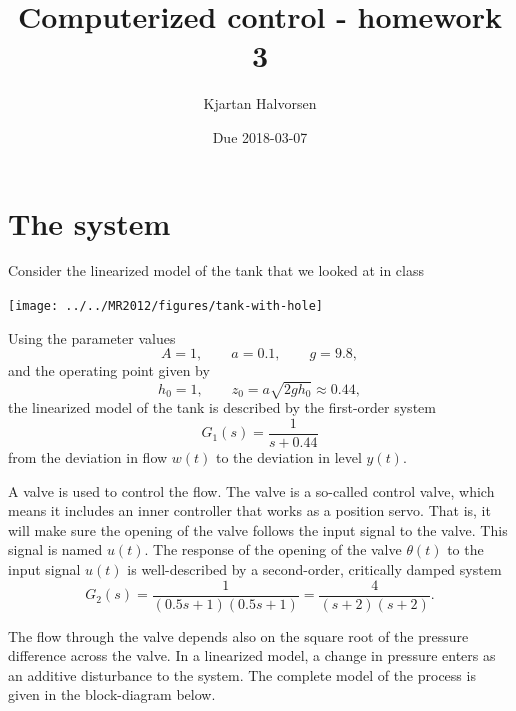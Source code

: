 \documentclass[a4paper]{scrartcl}
\author{Kjartan Halvorsen}
\date{Due 2018-03-07}
\title{Computerized control - homework 3}
\begin{document}
\maketitle

\section*{The system}
\label{sec-1}
Consider the linearized model of the tank that we looked at in class

\begin{center}
\texttt{[image: ../../MR2012/figures/tank-with-hole]}
\end{center}
Using the parameter values 
\[ A = 1, \qquad a = 0.1, \qquad g = 9.8,\]
and the operating point given by
\[ h_0 = 1, \qquad z_0 = a\sqrt{2gh_0} \approx 0.44,\]
the linearized model of the tank is described by the first-order system
\[ G_1(s) = \frac{1}{s + 0.44}\]
from the deviation in flow $w(t)$ to the deviation in level $y(t)$.

A valve is used to control the flow. The valve is a so-called control valve, which means it includes an inner controller that works as a position servo. That is, it will make sure the opening of the valve follows the input signal to the valve. This signal is named $u(t)$. The response of the opening of the valve $\theta(t)$ to the input signal $u(t)$ is well-described by a second-order, critically damped system
\[ G_2(s) = \frac{1}{(0.5s + 1)(0.5s+1)} = \frac{4}{(s+2)(s+2)}. \]

The flow through the valve depends also on the square root of the pressure difference across the valve. In a linearized model, a change in pressure enters as an additive disturbance to the system. The complete model of the process is given in the block-diagram below.

  \begin{center}
\end{center}
\end{document}
